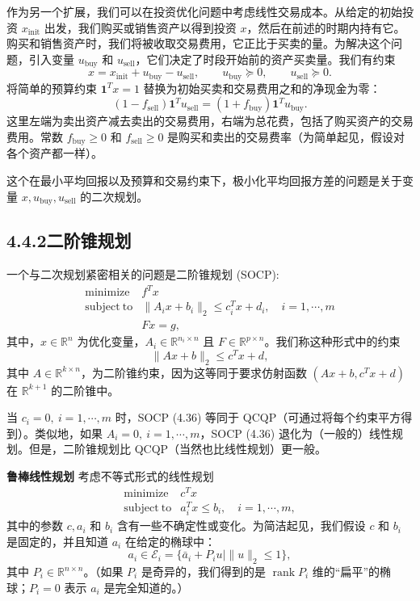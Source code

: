 \documentclass[UTF8, 12pt, fontset=fandol, oneside]{ctexart}
\begin{document}
作为另一个扩展，我们可以在投资优化问题中考虑线性交易成本。从给定的初始投资 $x_{\mathrm{init}}$ 出发，我们购买或销售资产以得到投资 $x$，然后在前述的时期内持有它。购买和销售资产时，我们将被收取交易费用，它正比于买卖的量。为解决这个问题，引入变量 $u_{\mathrm{buy}}$ 和 $u_{\mathrm{sell}}$，它们决定了时段开始前的资产买卖量。我们有约束
\[
x=x_{\mathrm{init}}+u_{\mathrm{buy}}-u_{\mathrm{sell}},\qquad
u_{\mathrm{buy}}\succeq 0,\qquad
u_{\mathrm{sell}}\succeq 0.
\]
将简单的预算约束 $\mathbf{1}^Tx=1$ 替换为初始买卖和交易费用之和的净现金为零：
\[
(1-f_{\mathrm{sell}})\mathbf{1}^Tu_{\mathrm{sell}}=(1+f_{\mathrm{buy}})\mathbf{1}^Tu_{\mathrm{buy}}.
\]
这里左端为卖出资产减去卖出的交易费用，右端为总花费，包括了购买资产的交易费用。常数 $f_{\mathrm{buy}}\geq 0$ 和 $f_{\mathrm{sell}}\geq 0$ 是购买和卖出的交易费率（为简单起见，假设对各个资产都一样）。

这个在最小平均回报以及预算和交易约束下，极小化平均回报方差的问题是关于变量 $x,u_{\mathrm{buy}},u_{\mathrm{sell}}$ 的二次规划。

\subsection*{4.4.2\quad 二阶锥规划}

一个与二次规划紧密相关的问题是二阶锥规划 (SOCP):
\begin{equation}
\begin{array}{ll}
\mathop{\mathrm{minimize}} & f^Tx\\
\mathrm{subject\ to} & \|A_ix+b_i\|_2\leq c_i^Tx+d_i,\quad i=1,\cdots,m\\
& Fx=g,
\end{array}
\tag{4.36}
\end{equation}
其中，$x\in\mathbb{R}^n$ 为优化变量，$A_i\in\mathbb{R}^{n_i\times n}$ 且 $F\in\mathbb{R}^{p\times n}$。我们称这种形式中的约束
\[
\|Ax+b\|_2\leq c^Tx+d,
\]
其中 $A\in\mathbb{R}^{k\times n}$，为二阶锥约束，因为这等同于要求仿射函数 $(Ax+b,c^Tx+d)$ 在 $\mathbb{R}^{k+1}$ 的二阶锥中。

当 $c_i=0,\ i=1,\cdots,m$ 时，SOCP (4.36) 等同于 QCQP（可通过将每个约束平方得到）。类似地，如果 $A_i=0,\ i=1,\cdots,m$，SOCP (4.36) 退化为（一般的）线性规划。但是，二阶锥规划比 QCQP（当然也比线性规划）更一般。

\noindent\textbf{鲁棒线性规划}\quad
考虑不等式形式的线性规划
\[
\begin{array}{ll}
\mathop{\mathrm{minimize}} & c^Tx\\
\mathrm{subject\ to} & a_i^Tx\leq b_i,\quad i=1,\cdots,m,
\end{array}
\]
其中的参数 $c,a_i$ 和 $b_i$ 含有一些不确定性或变化。为简洁起见，我们假设 $c$ 和 $b_i$ 是固定的，并且知道 $a_i$ 在给定的椭球中：
\[
a_i\in\mathcal{E}_i=\{\bar a_i+P_iu\mid \|u\|_2\leq 1\},
\]
其中 $P_i\in\mathbb{R}^{n\times n}$。（如果 $P_i$ 是奇异的，我们得到的是 $\operatorname{rank}P_i$ 维的“扁平”的椭球；$P_i=0$ 表示 $a_i$ 是完全知道的。）
\end{document}
